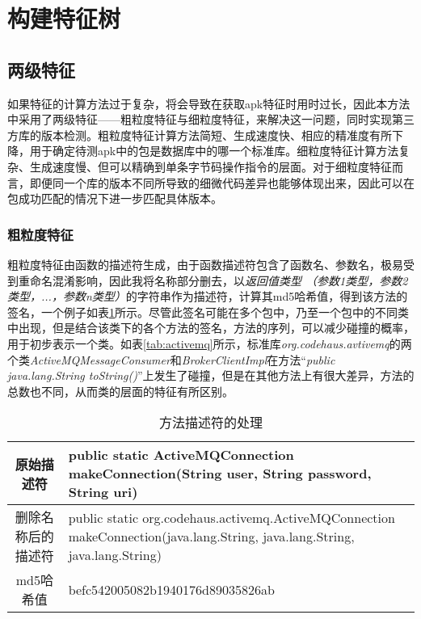 \section{构建特征树}

\subsection{两级特征}
如果特征的计算方法过于复杂，将会导致在获取apk特征时用时过长，因此本方法中采用了两级特征——粗粒度特征与细粒度特征，来解决这一问题，同时实现第三方库的版本检测。粗粒度特征计算方法简短、生成速度快、相应的精准度有所下降，用于确定待测apk中的包是数据库中的哪一个标准库。细粒度特征计算方法复杂、生成速度慢、但可以精确到单条字节码操作指令的层面。对于细粒度特征而言，即便同一个库的版本不同所导致的细微代码差异也能够体现出来，因此可以在包成功匹配的情况下进一步匹配具体版本。


\subsubsection{粗粒度特征}

粗粒度特征由函数的描述符生成，由于函数描述符包含了函数名、参数名，极易受到重命名混淆影响，因此我将名称部分删去，以\textit{返回值类型 （参数1类型，参数2类型，...，参数n类型）}的字符串作为描述符，计算其md5哈希值，得到该方法的签名，一个例子如表\ref{tab:descriptor}所示。尽管此签名可能在多个包中，乃至一个包中的不同类中出现，但是结合该类下的各个方法的签名，方法的序列，可以减少碰撞的概率，用于初步表示一个类。如表\ref{tab:activemq}所示，标准库\textit{org.codehaus.avtivemq}的两个类\textit{ActiveMQMessageConsumer}和\textit{BrokerClientImpl}在方法“\textit{public java.lang.String toString()}”上发生了碰撞，但是在其他方法上有很大差异，方法的总数也不同，从而类的层面的特征有所区别。


\begin{table}[!hpt]
  \caption{方法描述符的处理}
  \label{tab:descriptor}
  \centering
  \begin{tabular}{cp{8cm}} \toprule
    原始描述符 & public static ActiveMQConnection makeConnection(String user, String password, String uri)\\ \midrule
    删除名称后的描述符  & public static org.codehaus.activemq.ActiveMQConnection makeConnection(java.lang.String, java.lang.String, java.lang.String) \\ \midrule
    md5哈希值      & befc542005082b1940176d89035826ab \\ \bottomrule
  \end{tabular}
\end{table}

